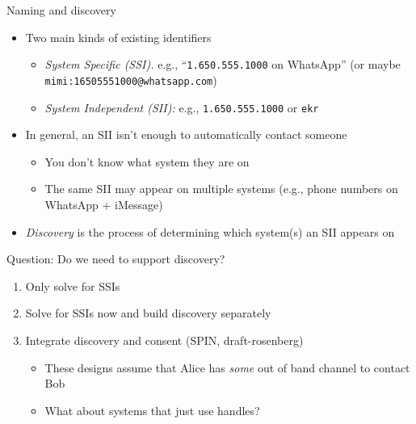 \documentclass[helvetica]{beamer}
\begin{document}
\begin{frame}{Naming and discovery}

  \begin{itemize}
  \item Two main kinds of existing identifiers
    \begin{itemize}
    \item \emph{System Specific (SSI).} e.g., ``\texttt{1.650.555.1000} on WhatsApp''
      (or maybe \texttt{mimi:16505551000@whatsapp.com})
    \item \emph{System Independent (SII):} e.g., \texttt{1.650.555.1000} or \texttt{ekr}
    \end{itemize}
  \item In general, an SII isn't enough to automatically contact someone
    \begin{itemize}
    \item You don't know what system they are on
    \item The same SII may appear on multiple systems (e.g., phone numbers on WhatsApp + iMessage)
    \end{itemize}
  \item \emph{Discovery} is the process of determining which system(s) an SII appears on
  \end{itemize}
\end{frame}

\begin{frame}{Question: Do we need to support discovery?}
  
  \begin{enumerate}
    \item Only solve for SSIs
    \item Solve for SSIs now and build discovery separately
    \item Integrate discovery and consent (SPIN, draft-rosenberg)
      \begin{itemize}
      \item These designs assume that Alice has \emph{some} out of band channel to contact Bob
      \item What about systems that just use handles?
      \end{itemize}
  \end{enumerate}      
\end{frame}
\end{document}
